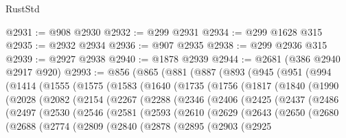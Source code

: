 \begin{lexlean}{RustStd}
\begin{coremodule}
@2931 := @908 @2930
@2932 := @299 @2931
@2934 := @299 @1628 @315
@2935 := @2932 @2934
@2936 := @907 @2935
@2938 := @299 @2936 @315
@2939 := @2927 @2938
@2940 := @1878 @2939
@2944 := @2681 (@386 @2940 @2917 @920)
@2993 := @856
    (@865
      (@881
        (@887
          (@893
            (@945
              (@951
                (@994
                  (@1414
                    (@1555
                      (@1575
                        (@1583
                          (@1640
                            (@1735
                              (@1756
                                (@1817
                                  (@1840
                                    (@1990
                                      (@2028
                                        (@2082
                                          (@2154
                                            (@2267
                                              (@2288
                                                (@2346
                                                  (@2406
                                                    (@2425
                                                      (@2437
                                                        (@2486
                                                          (@2497
                                                            (@2530
                                                              (@2546
                                                                (@2581
                                                                  (@2593
                                                                    (@2610
                                                                      (@2629
                                                                        (@2643
                                                                          (@2650
                                                                            (@2680
                                                                              (@2688
                                                                                (@2774
                                                                                  (@2809
                                                                                    (@2840
                                                                                      (@2878
                                                                                        (@2895
                                                                                          (@2903
                                                                                            (@2925

\end{coremodule}
\end{lexlean}
